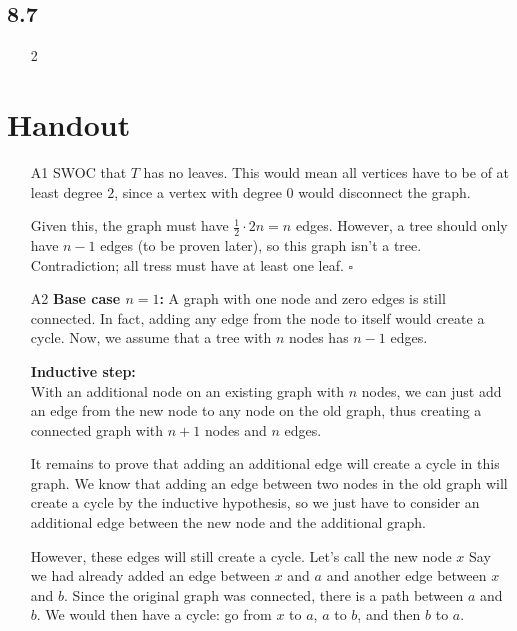 \documentclass[12pt]{article}
\begin{document}
\subsection*{8.7}\label{sec:8.7}

\begin{enumerate}
      \item[2]
\end{enumerate}

\pagebreak

\section{Handout}\label{sec:handout}

\begin{itemize}
      \item[A1] SWOC that $T$ has no leaves.
            This would mean all vertices have to be of at least degree $2$,
            since a vertex with degree $0$ would disconnect the graph.

            Given this, the graph must have $\frac{1}{2} \cdot 2n=n$ edges.
            However, a tree should only have $n-1$ edges (to be proven later),
            so this graph isn't a tree.
            Contradiction; all tress must have at least one leaf. $\square$
      \item[A2] \textbf{Base case $n=1$:}
            A graph with one node and zero edges is still connected.
            In fact, adding any edge from the node to itself would create a cycle.
            Now, we assume that a tree with $n$ nodes has $n-1$ edges.

            \textbf{Inductive step:} \\
            With an additional node on an existing graph with $n$ nodes,
            we can just add an edge from the new node to any node on the old graph,
            thus creating a connected graph with $n+1$ nodes and $n$ edges.

            It remains to prove that adding an additional edge will
            create a cycle in this graph.
            We know that adding an edge between two nodes in the old graph
            will create a cycle by the inductive hypothesis, so we just
            have to consider an additional edge between the new node
            and the additional graph.

            However, these edges will still create a cycle.
            Let's call the new node $x$
            Say we had already added an edge between $x$ and $a$ and
            another edge between $x$ and $b$.
            Since the original graph was connected, there is a path between
            $a$ and $b$.
            We would then have a cycle: go from $x$ to $a$, $a$ to $b$,
            and then $b$ to $a$.


\end{itemize}
\end{document}
